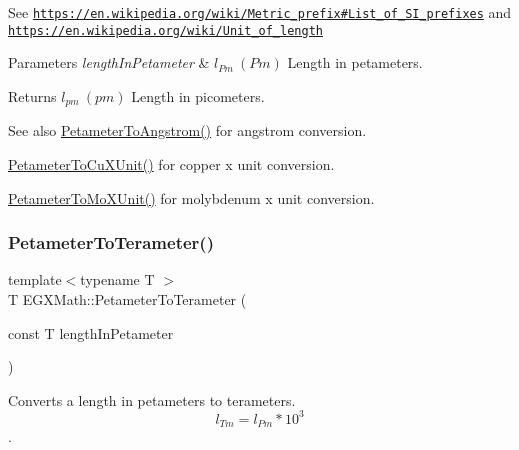 See \href{https://en.wikipedia.org/wiki/Metric_prefix#List_of_SI_prefixes}{\tt https\+://en.\+wikipedia.\+org/wiki/\+Metric\+\_\+prefix\#\+List\+\_\+of\+\_\+\+S\+I\+\_\+prefixes} and \href{https://en.wikipedia.org/wiki/Unit_of_length}{\tt https\+://en.\+wikipedia.\+org/wiki/\+Unit\+\_\+of\+\_\+length} 
\begin{DoxyParams}{Parameters}
{\em length\+In\+Petameter} & $ l_{Pm}\ (Pm)$ Length in petameters. \\
\hline
\end{DoxyParams}
\begin{DoxyReturn}{Returns}
$ l_{pm}\ (pm)$ Length in picometers. 
\end{DoxyReturn}
\begin{DoxySeeAlso}{See also}
\mbox{\hyperlink{group___e_g_x_math-_conversions-_length_conversions-_s_i-_petameter-_non-_s_i_ga2acc301b8b78a80d23a150da8cba3814}{Petameter\+To\+Angstrom()}} for angstrom conversion. 

\mbox{\hyperlink{group___e_g_x_math-_conversions-_length_conversions-_s_i-_petameter-_non-_s_i_gad9b37964189c5963e4c634122fd763fe}{Petameter\+To\+Cu\+X\+Unit()}} for copper x unit conversion. 

\mbox{\hyperlink{group___e_g_x_math-_conversions-_length_conversions-_s_i-_petameter-_non-_s_i_ga29419ba09bb33a7bc9e23f8cde2efea3}{Petameter\+To\+Mo\+X\+Unit()}} for molybdenum x unit conversion. 
\end{DoxySeeAlso}
\mbox{\label{group___e_g_x_math-_conversions-_length_conversions-_s_i-_petameter-_s_i_ga49df669a2666aa9681c907ea80e4c34c}} 
\subsubsection{\texorpdfstring{Petameter\+To\+Terameter()}{PetameterToTerameter()}}
{\footnotesize\ttfamily template$<$typename T $>$ \\
T E\+G\+X\+Math\+::\+Petameter\+To\+Terameter (\begin{DoxyParamCaption}\item[{const T}]{length\+In\+Petameter }\end{DoxyParamCaption})}



Converts a length in petameters to terameters. \[ l_{Tm}=l_{Pm} * 10^{3} \]. 

